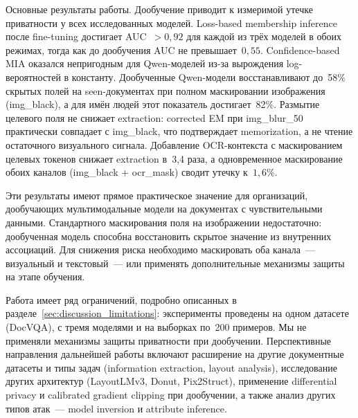 \documentclass[a4paper,12pt]{extarticle}
\begin{document}
Основные результаты работы. Дообучение приводит к измеримой утечке приватности у всех исследованных моделей. Loss-based membership inference после fine-tuning достигает AUC~$> 0{,}92$ для каждой из трёх моделей в обоих режимах, тогда как до дообучения AUC не превышает~$0{,}55$. Confidence-based MIA оказался непригодным для Qwen-моделей из-за вырождения log-вероятностей в константу. Дообученные Qwen-модели восстанавливают до~58\% скрытых полей на seen-документах при полном маскировании изображения (img\_black), а для имён людей этот показатель достигает~82\%. Размытие целевого поля не снижает extraction: corrected EM при img\_blur\_50 практически совпадает с img\_black, что подтверждает memorization, а не чтение остаточного визуального сигнала. Добавление OCR-контекста с маскированием целевых токенов снижает extraction в~3{,}4 раза, а одновременное маскирование обоих каналов (img\_black + ocr\_mask) сводит утечку к~$1{,}6$\%.

Эти результаты имеют прямое практическое значение для организаций, дообучающих мультимодальные модели на документах с чувствительными данными. Стандартного маскирования поля на изображении недостаточно: дообученная модель способна восстановить скрытое значение из внутренних ассоциаций. Для снижения риска необходимо маскировать оба канала~--- визуальный и текстовый~--- или применять дополнительные механизмы защиты на этапе обучения.

Работа имеет ряд ограничений, подробно описанных в разделе~\ref{sec:discussion_limitations}: эксперименты проведены на одном датасете (DocVQA), с тремя моделями и на выборках по~200 примеров. Мы не применяли механизмы защиты приватности при дообучении. Перспективные направления дальнейшей работы включают расширение на другие документные датасеты и типы задач (information extraction, layout analysis), исследование других архитектур (LayoutLMv3, Donut, Pix2Struct), применение differential privacy и calibrated gradient clipping при дообучении, а также анализ других типов атак~--- model inversion и attribute inference.
\end{document}
